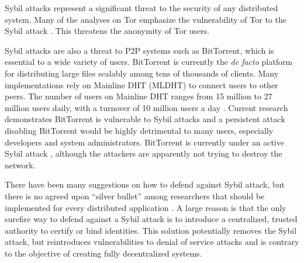 \documentclass[11pt,conference]{IEEEtran}
\begin{document}
Sybil attacks represent a significant threat to the security of any distributed system.
Many of the analyses on Tor \cite{dingledine2004tor} emphasize the vulnerability of Tor to the Sybil attack \cite{bauer2007low}.
This threatens the anonymity of Tor users.

Sybil attacks are also a threat to P2P systems such as BitTorrent, which is essential to a wide variety of users.
BitTorrent is currently the \textit{de facto} platform for distributing large files scalably among tens of thousands of clients.
Many implementations rely on Mainline DHT (MLDHT) \cite{mainline} to connect users to other peers.
The number of users on Mainline DHT ranges from 15 million to 27 million users daily, with a turnover of 10 million users a day \cite{mainlineMeasure}.
Current research demonstrates BitTorrent is vulnerable to Sybil attacks and a persistent attack disabling BitTorrent would be highly detrimental to many users, especially developers and system administrators.
BitTorrent is currently under an active Sybil attack \cite{sybilbit}, although the attackers are apparently not trying to destroy the network.

There have been many suggestions on how to defend against Sybil attack, but there is no agreed upon ``silver bullet'' among researchers that should be implemented for every distributed application \cite{levine2006survey} \cite{dhtsec}.
A large reason is that the only surefire way to defend against a Sybil attack is to introduce a centralized, trusted authority to certify or bind identities.
This solution potentially removes the Sybil attack, but reintroduces vulnerabilities to denial of service attacks and is contrary to the objective of creating fully decentralized systems.


\end{document}
